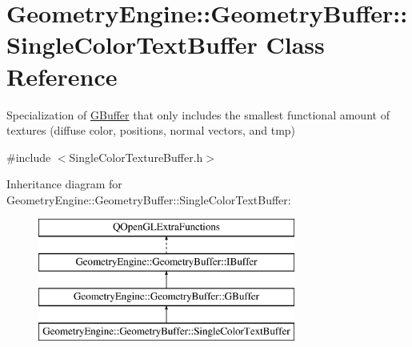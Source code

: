 \hypertarget{class_geometry_engine_1_1_geometry_buffer_1_1_single_color_text_buffer}{}\section{Geometry\+Engine\+::Geometry\+Buffer\+::Single\+Color\+Text\+Buffer Class Reference}
\label{class_geometry_engine_1_1_geometry_buffer_1_1_single_color_text_buffer}


Specialization of \mbox{\hyperlink{class_geometry_engine_1_1_geometry_buffer_1_1_g_buffer}{G\+Buffer}} that only includes the smallest functional amount of textures (diffuse color, positions, normal vectors, and tmp)  




{\ttfamily \#include $<$Single\+Color\+Texture\+Buffer.\+h$>$}

Inheritance diagram for Geometry\+Engine\+::Geometry\+Buffer\+::Single\+Color\+Text\+Buffer\+:\begin{figure}[H]
\begin{center}
\leavevmode
\includegraphics[height=4.000000cm]{class_geometry_engine_1_1_geometry_buffer_1_1_single_color_text_buffer}
\end{center}
\end{figure}
